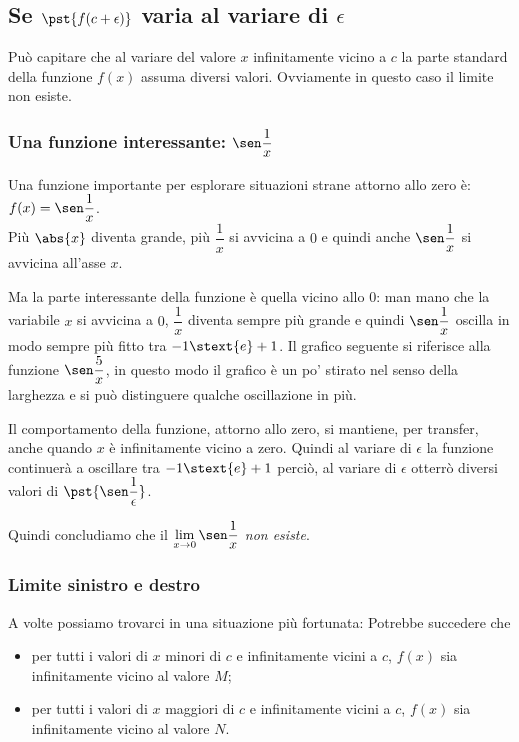 \subsection{Se \(\pst{f(c+\epsilon)}\) varia al variare di \(\epsilon\)}
\label{subsec:cont_limiti_nonsempreesiste}

Può capitare che al variare del valore \(x\) infinitamente vicino a \(c\) la 
parte standard della funzione \(f(x)\) assuma diversi valori. Ovviamente in 
questo caso il limite non esiste.

\subsubsection{Una funzione interessante: \(\sen \dfrac{1}{x}\)}

\noindent Una funzione importante per esplorare situazioni strane attorno 
allo zero è: \(f(x) = \sen \dfrac{1}{x}\).\\
Più \(\abs{x}\) diventa grande, più \(\dfrac{1}{x}\) si avvicina a \(0\) e 
quindi anche \(\sen \dfrac{1}{x}\) si avvicina all'asse \(x\).

Ma la parte interessante della funzione è quella vicino allo \(0\):
man mano che la variabile \(x\) si avvicina a \(0\), \(\dfrac{1}{x}\) diventa 
sempre più grande e quindi \(\sen \dfrac{1}{x}\) oscilla in modo sempre più 
fitto tra \(-1 \stext{e} +1\).
Il grafico seguente si riferisce alla funzione \(\sen \dfrac{5}{x}\), in 
questo modo il grafico è un po' stirato nel senso della larghezza e si può 
distinguere qualche oscillazione in più.
\begin{center} \limitesinunosux \end{center}
Il comportamento della funzione, attorno allo zero, si mantiene, per 
transfer, anche quando \(x\) è infinitamente vicino a zero.
Quindi al variare di \(\epsilon\) la funzione continuerà a oscillare tra 
\(-1 \stext{e} +1\) perciò, al variare di \(\epsilon\) otterrò diversi valori 
di \(\pst{\sen \dfrac{1}{\epsilon}}\).

Quindi concludiamo che il 
\(\displaystyle \lim_{x \to 0}\sen \dfrac{1}{x}\) \emph{non esiste}.

\subsubsection{Limite sinistro e destro}
A volte possiamo trovarci in una situazione più fortunata:
Potrebbe succedere che 
\begin{itemize} [nosep]
\item 
per tutti i valori di \(x\) minori di \(c\) e infinitamente vicini a \(c\), 
\(f(x)\) sia infinitamente vicino al valore \(M\);
\item 
per tutti i valori di \(x\) maggiori di \(c\) e infinitamente vicini a \(c\), 
\(f(x)\) sia infinitamente vicino al valore \(N\). 
\end{itemize}

